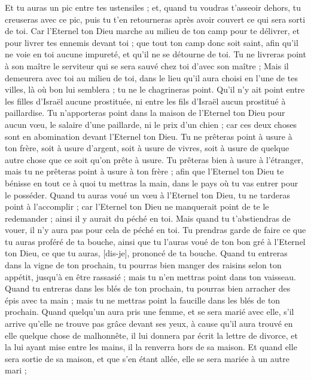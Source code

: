 \begin{multicols}{2}
Et tu auras un pic entre tes ustensiles ; et, quand tu voudras t'asseoir dehors, tu creuseras avec ce pic, puis tu t'en retourneras après avoir couvert ce qui sera sorti de toi.
Car l'Eternel ton Dieu marche au milieu de ton camp pour te délivrer, et pour livrer tes ennemis devant toi ; que tout ton camp donc soit saint, afin qu'il ne voie en toi aucune impureté, et qu'il ne se détourne de toi.
Tu ne livreras point à son maître le serviteur qui se sera sauvé chez toi d'avec son maître ;
Mais il demeurera avec toi au milieu de toi, dans le lieu qu'il aura choisi en l'une de tes villes, là où bon lui semblera ; tu ne le chagrineras point.
Qu'il n'y ait point entre les filles d'Israël aucune prostituée, ni entre les fils d'Israël aucun prostitué à paillardise.
Tu n'apporteras point dans la maison de l'Eternel ton Dieu pour aucun vœu, le salaire d'une paillarde, ni le prix d'un chien ; car ces deux choses sont en abomination devant l'Eternel ton Dieu.
Tu ne prêteras point à usure à ton frère, soit à usure d'argent, soit à usure de vivres, soit à usure de quelque autre chose que ce soit qu'on prête à usure.
Tu prêteras bien à usure à l'étranger, mais tu ne prêteras point à usure à ton frère ; afin que l'Eternel ton Dieu te bénisse en tout ce à quoi tu mettras la main, dans le pays où tu vas entrer pour le posséder.
Quand tu auras voué un vœu à l'Eternel ton Dieu, tu ne tarderas point à l'accomplir ; car l'Eternel ton Dieu ne manquerait point de te le redemander ; ainsi il y aurait du péché en toi.
Mais quand tu t'abstiendras de vouer, il n'y aura pas pour cela de péché en toi.
Tu prendras garde de faire ce que tu auras proféré de ta bouche, ainsi que tu l'auras voué de ton bon gré à l'Eternel ton Dieu, ce que tu auras, [dis-je], prononcé de ta bouche.
Quand tu entreras dans la vigne de ton prochain, tu pourras bien manger des raisins selon ton appétit, jusqu'à en être rassasié ; mais tu n'en mettras point dans ton vaisseau.
Quand tu entreras dans les blés de ton prochain, tu pourras bien arracher des épis avec ta main ; mais tu ne mettras point la faucille dans les blés de ton prochain.
\VerseOne{}Quand quelqu'un aura pris une femme, et se sera marié avec elle, s'il arrive qu'elle ne trouve pas grâce devant ses yeux, à cause qu'il aura trouvé en elle quelque chose de malhonnête, il lui donnera par écrit la lettre de divorce, et la lui ayant mise entre les mains, il la renverra hors de sa maison.
Et quand elle sera sortie de sa maison, et que s'en étant allée, elle se sera mariée à un autre mari ;

\end{multicols}

